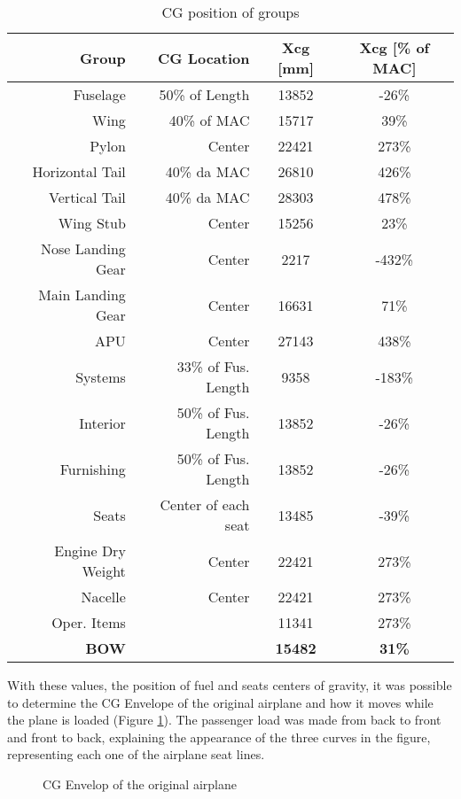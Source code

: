 \begin{table}[htbp]
  \centering
  \caption{CG position of groups}
    \begin{tabular}{rrcc}
    \toprule
    \textbf{ Group} & \textbf{CG Location} & \textbf{Xcg [mm]} & \textbf{Xcg [\% of MAC]} \\
    \midrule
    Fuselage & 50\% of Length & 13852 & -26\% \\
    Wing  & 40\% of MAC & 15717 & 39\% \\
    Pylon & Center & 22421 & 273\% \\
    Horizontal Tail & 40\% da MAC & 26810 & 426\% \\
    Vertical Tail & 40\% da MAC & 28303 & 478\% \\
    Wing Stub & Center & 15256 & 23\% \\
    Nose Landing Gear & Center & 2217  & -432\% \\
    Main Landing Gear & Center & 16631 & 71\% \\
    APU   & Center & 27143 & 438\% \\
    Systems & 33\% of Fus. Length & 9358  & -183\% \\
    Interior & 50\% of Fus. Length & 13852 & -26\% \\
    Furnishing & 50\% of Fus. Length & 13852 & -26\% \\
    Seats & Center of each seat & 13485 & -39\% \\
    Engine Dry Weight & Center & 22421 & 273\% \\
    Nacelle & Center & 22421 & 273\% \\
    Oper. Items &       & 11341 & 273\% \\
    \textbf{BOW} & \textbf{} & \textbf{15482} & \textbf{31\%} \\
    \bottomrule
    \end{tabular}%
  \label{tab:cgposition}%
\end{table}%



With these values, the position of fuel and seats centers of gravity, it was possible to determine the CG Envelope of the original airplane and how it moves while the plane is loaded (Figure \ref{fig:compressiblepolar}). The passenger load was made from back to front and front to back, explaining the appearance of the three curves in the figure, representing each one of the airplane seat lines.


\begin{figure}[H] %
\caption{CG Envelop of the original airplane}
\label{fig:compressiblepolar}
\end{figure}


